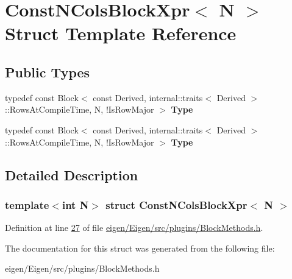 \hypertarget{struct_const_n_cols_block_xpr}{}\section{Const\+N\+Cols\+Block\+Xpr$<$ N $>$ Struct Template Reference}
\label{struct_const_n_cols_block_xpr}
\subsection*{Public Types}
\begin{DoxyCompactItemize}
\item 
\mbox{\label{struct_const_n_cols_block_xpr_a12a950b35aad45156aeb24eef23dc5d2}} 
typedef const Block$<$ const Derived, internal\+::traits$<$ Derived $>$\+::Rows\+At\+Compile\+Time, N, !Is\+Row\+Major $>$ {\bfseries Type}
\item 
\mbox{\label{struct_const_n_cols_block_xpr_a12a950b35aad45156aeb24eef23dc5d2}} 
typedef const Block$<$ const Derived, internal\+::traits$<$ Derived $>$\+::Rows\+At\+Compile\+Time, N, !Is\+Row\+Major $>$ {\bfseries Type}
\end{DoxyCompactItemize}


\subsection{Detailed Description}
\subsubsection*{template$<$int N$>$\newline
struct Const\+N\+Cols\+Block\+Xpr$<$ N $>$}



Definition at line \hyperlink{eigen_2_eigen_2src_2plugins_2_block_methods_8h_source_l00027}{27} of file \hyperlink{eigen_2_eigen_2src_2plugins_2_block_methods_8h_source}{eigen/\+Eigen/src/plugins/\+Block\+Methods.\+h}.



The documentation for this struct was generated from the following file\+:\begin{DoxyCompactItemize}
\item 
eigen/\+Eigen/src/plugins/\+Block\+Methods.\+h\end{DoxyCompactItemize}
